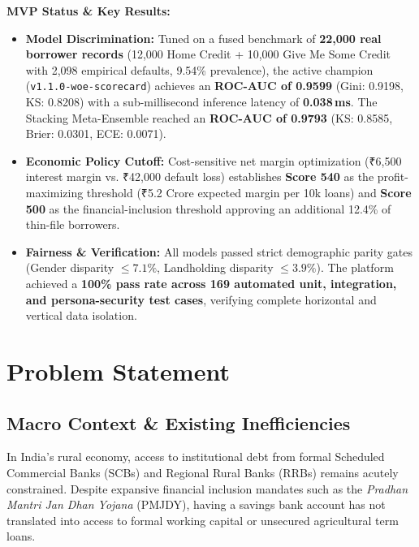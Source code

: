\documentclass[11pt,a4paper,oneside]{report}
\begin{document}
\vspace{0.3cm}
\noindent\textbf{MVP Status \& Key Results:}
\begin{itemize}[leftmargin=1.5em, itemsep=2pt]
  \item \textbf{Model Discrimination:} Tuned on a fused benchmark of \textbf{22,000 real borrower records} (12,000 Home Credit + 10,000 Give Me Some Credit with 2,098 empirical defaults, 9.54\% prevalence), the active champion (\texttt{v1.1.0-woe-scorecard}) achieves an \textbf{ROC-AUC of 0.9599} (Gini: 0.9198, KS: 0.8208) with a sub-millisecond inference latency of \textbf{0.038\,ms}. The Stacking Meta-Ensemble reached an \textbf{ROC-AUC of 0.9793} (KS: 0.8585, Brier: 0.0301, ECE: 0.0071).
  \item \textbf{Economic Policy Cutoff:} Cost-sensitive net margin optimization (₹6,500 interest margin vs. ₹42,000 default loss) establishes \textbf{Score 540} as the profit-maximizing threshold (₹5.2 Crore expected margin per 10k loans) and \textbf{Score 500} as the financial-inclusion threshold approving an additional 12.4\% of thin-file borrowers.
  \item \textbf{Fairness \& Verification:} All models passed strict demographic parity gates (Gender disparity $\le 7.1\%$, Landholding disparity $\le 3.9\%$). The platform achieved a \textbf{100\% pass rate across 169 automated unit, integration, and persona-security test cases}, verifying complete horizontal and vertical data isolation.
\end{itemize}



\tableofcontents
\newpage
\listoffigures
\newpage
\listoftables
\newpage

\setcounter{page}{1}


\chapter{Problem Statement}
\label{chap:problem_statement}

\section{Macro Context \& Existing Inefficiencies}
In India's rural economy, access to institutional debt from formal Scheduled Commercial Banks (SCBs) and Regional Rural Banks (RRBs) remains acutely constrained. Despite expansive financial inclusion mandates such as the \textit{Pradhan Mantri Jan Dhan Yojana} (PMJDY), having a savings bank account has not translated into access to formal working capital or unsecured agricultural term loans. 
\end{document}
